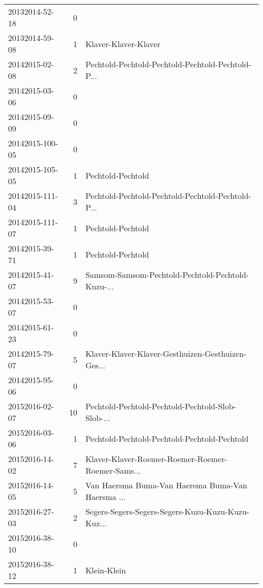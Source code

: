 \begin{tabular}{lrl}
20132014-52-18  &         0 &                                                    \\
20132014-59-08  &         1 &                               Klaver-Klaver-Klaver \\
20142015-02-08  &         2 &  Pechtold-Pechtold-Pechtold-Pechtold-Pechtold-P... \\
20142015-03-06  &         0 &                                                    \\
20142015-09-09  &         0 &                                                    \\
20142015-100-05 &         0 &                                                    \\
20142015-105-05 &         1 &                                  Pechtold-Pechtold \\
20142015-111-04 &         3 &  Pechtold-Pechtold-Pechtold-Pechtold-Pechtold-P... \\
20142015-111-07 &         1 &                                  Pechtold-Pechtold \\
20142015-39-71  &         1 &                                  Pechtold-Pechtold \\
20142015-41-07  &         9 &  Samsom-Samsom-Pechtold-Pechtold-Pechtold-Kuzu-... \\
20142015-53-07  &         0 &                                                    \\
20142015-61-23  &         0 &                                                    \\
20142015-79-07  &         5 &  Klaver-Klaver-Klaver-Gesthuizen-Gesthuizen-Ges... \\
20142015-95-06  &         0 &                                                    \\
20152016-02-07  &        10 &  Pechtold-Pechtold-Pechtold-Pechtold-Slob-Slob-... \\
20152016-03-06  &         1 &       Pechtold-Pechtold-Pechtold-Pechtold-Pechtold \\
20152016-14-02  &         7 &  Klaver-Klaver-Roemer-Roemer-Roemer-Roemer-Sams... \\
20152016-14-05  &         5 &  Van Haersma Buma-Van Haersma Buma-Van Haersma ... \\
20152016-27-03  &         2 &  Segers-Segers-Segers-Segers-Kuzu-Kuzu-Kuzu-Kuz... \\
20152016-38-10  &         0 &                                                    \\
20152016-38-12  &         1 &                                        Klein-Klein \\
\bottomrule
\end{tabular}
